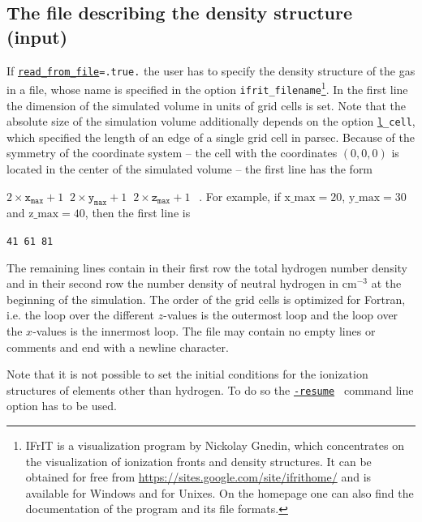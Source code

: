 \documentclass[a4paper,10pt]{article}
\begin{document}
\subsection{The file describing the density structure (input)}
\label{file:density}
If \texttt{\hyperref[opt:readfromfile]{read\_from\_file}=.true.} the user has to 
specify the density structure of the gas in a file, whose name is specified in 
the option \texttt{ifrit\_filename}\footnote{IFrIT is a visualization program 
by Nickolay Gnedin, which concentrates on the visualization of ionization 
fronts and density structures. It can be obtained for free from 
\url{https://sites.google.com/site/ifrithome/} and is available for Windows  and 
for Unixes. 
On the homepage one can also find the documentation of the program
and its file formats.}. 
In the first line the dimension of the simulated volume in units of grid cells  
is set. Note that the absolute size of the simulation volume additionally 
depends on the option \texttt{\hyperref[opt:lcell]l\_cell}, which specified the 
length of an edge of a single grid cell in parsec. Because of the symmetry of 
the coordinate system -- the cell with the coordinates $(0,0,0)$ 
is located in the center of the simulated volume -- the first line has the form

$2\times\mathtt{x_{max}}+1 ~$  $2\times\mathtt{y_{max}}+1 ~$
$2\times\mathtt{z_{max}}+1~~$ .
For example, if $\mathrm{x\_{max}}=20$, $\mathrm{y\_{max}}=30$ and 
$\mathrm{z\_{max}}=40$, then the first line is

\texttt{41 61 81}

The remaining lines contain in their first row the total hydrogen number 	
density and in their second row the number density of neutral hydrogen in 
$\mathrm{cm^{-3}}$ at the beginning of the simulation. The order of the grid 
cells is optimized for Fortran, i.e. the loop over the different 
$z$-values is the outermost loop and the loop over the $x$-values is the  
innermost loop. The file may contain no empty lines or comments and end with a 
newline character.
 
Note that it is not possible to set the initial conditions for the ionization  
structures of elements other than hydrogen. To do so the 
\texttt{\hyperref[sec:commandlineoptions]{-resume} }
command line option has to be used.
\end{document}
